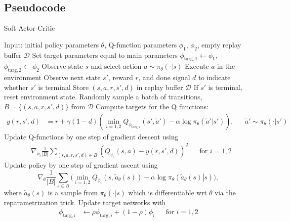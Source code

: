 \documentclass[letterpaper,10pt,english]{sphinxmanual}
\begin{document}
\subsection{Pseudocode}
\label{\detokenize{algorithms/lac:pseudocode}}\begin{algorithm}[H]
    \caption{Soft Actor-Critic}
    \label{alg1}
\begin{algorithmic}[1]
    \STATE Input: initial policy parameters $\theta$, Q-function parameters $\phi_1$, $\phi_2$, empty replay buffer $\mathcal{D}$
    \STATE Set target parameters equal to main parameters $\phi_{\text{targ},1} \leftarrow \phi_1$, $\phi_{\text{targ},2} \leftarrow \phi_2$
    \REPEAT
        \STATE Observe state $s$ and select action $a \sim \pi_{\theta}(\cdot|s)$
        \STATE Execute $a$ in the environment
        \STATE Observe next state $s'$, reward $r$, and done signal $d$ to indicate whether $s'$ is terminal
        \STATE Store $(s,a,r,s',d)$ in replay buffer $\mathcal{D}$
        \STATE If $s'$ is terminal, reset environment state.
                \STATE Randomly sample a batch of transitions, $B = \{ (s,a,r,s',d) \}$ from $\mathcal{D}$
                \STATE Compute targets for the Q functions:
                \begin{align*}
                    y (r,s',d) &= r + \gamma (1-d) \left(\min_{i=1,2} Q_{\phi_{\text{targ}, i}} (s', \tilde{a}') - \alpha \log \pi_{\theta}(\tilde{a}'|s')\right), && \tilde{a}' \sim \pi_{\theta}(\cdot|s')
                \end{align*}
                \STATE Update Q-functions by one step of gradient descent using
                \begin{align*}
                    & \nabla_{\phi_i} \frac{1}{|B|}\sum_{(s,a,r,s',d) \in B} \left( Q_{\phi_i}(s,a) - y(r,s',d) \right)^2 && \text{for } i=1,2
                \end{align*}
                \STATE Update policy by one step of gradient ascent using
                \begin{equation*}
                    \nabla_{\theta} \frac{1}{|B|}\sum_{s \in B} \Big(\min_{i=1,2} Q_{\phi_i}(s, \tilde{a}_{\theta}(s)) - \alpha \log \pi_{\theta} \left(\left. \tilde{a}_{\theta}(s) \right| s\right) \Big),
                \end{equation*}
                where $\tilde{a}_{\theta}(s)$ is a sample from $\pi_{\theta}(\cdot|s)$ which is differentiable wrt $\theta$ via the reparametrization trick.
                \STATE Update target networks with
                \begin{align*}
                    \phi_{\text{targ},i} &\leftarrow \rho \phi_{\text{targ}, i} + (1-\rho) \phi_i && \text{for } i=1,2
                \end{align*}
            \ENDFOR
        \ENDIF
\end{algorithmic}
\end{algorithm}
\end{document}
